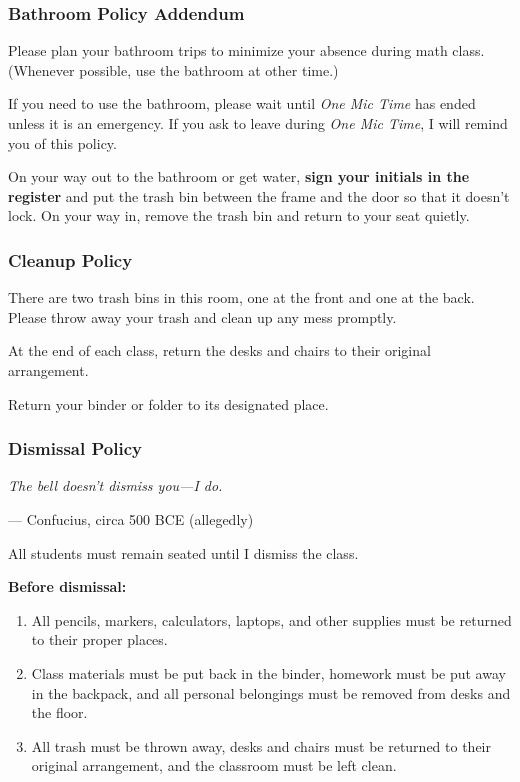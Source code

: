 \documentclass[10pt, aspectratio=169]{beamer}
\begin{document}
\begin{frame}
\frametitle{Bathroom Policy Addendum}
\pause

Please plan your bathroom trips to minimize your absence during math class. (Whenever possible, use the bathroom at other time.)
\pause
{}

If you need to use the bathroom, please wait until \textit{One Mic Time} has ended unless it is an emergency. If you ask to leave during \textit{One Mic Time}, I will remind you of this policy.\pause
{}

On your way out to the bathroom or get water, \textbf{sign your initials in the register} and put the trash bin between the frame and the door so that it doesn't lock. On your way in, remove the trash bin and return to your seat quietly.
\end{frame}

\begin{frame}
\frametitle{Cleanup Policy}
\pause

There are two trash bins in this room, one at the front and one at the back. Please throw away your trash and clean up any mess promptly.
\pause
{}

At the end of each class, return the desks and chairs to their original arrangement.
\pause
{}

Return your binder or folder to its designated place.
\end{frame}

\begin{frame}
\frametitle{Dismissal Policy}
\large
\pause

\begin{center}
\textit{The bell doesn't dismiss you---I do.}

\hfill--- Confucius, circa 500 BCE (allegedly)

\end{center}
\pause

All students must remain seated until I dismiss the class.
\pause

\textbf{Before dismissal:}
\pause

\begin{enumerate}[label=$\bullet$]
\item All pencils, markers, calculators, laptops, and other supplies must be returned to their proper places.
\pause

\item Class materials must be put back in the binder, homework must be put away in the backpack, and all personal belongings must be removed from desks and the floor.
\pause

\item All trash must be thrown away, desks and chairs must be returned to their original arrangement, and the classroom must be left clean.
\end{enumerate}
\end{frame}
\end{document}

